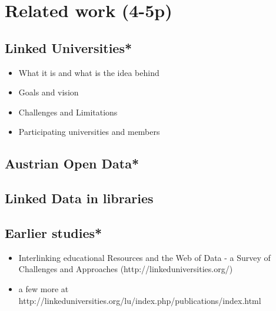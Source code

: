 \chapter{Related work (4-5p)}
\section{Linked Universities*}
\begin{itemize}
	\item What it is and what is the idea behind
	\item Goals and vision
	\item Challenges and Limitations
	\item Participating universities and members
\end{itemize}
\section{Austrian Open Data*}
\section{Linked Data in libraries}
\section{Earlier studies*}
\begin{itemize}
	\item Interlinking educational Resources and the Web of Data - a Survey of Challenges and Approaches (http://linkeduniversities.org/)
	\item a few more at http://linkeduniversities.org/lu/index.php/publications/index.html
\end{itemize}